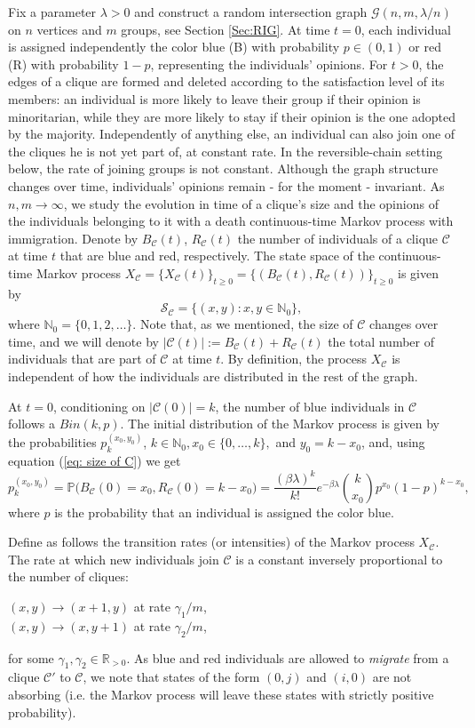 \documentclass{article}
\theoremstyle{remark}
\newtheorem*{partial proof}{Partial proof of the Conjecture}
\begin{document}
Fix a parameter $\lambda>0$ and construct a random intersection graph $\mathcal{G}(n,m,\lambda/n)$ on $n$ vertices and $m$ groups, see Section \ref{Sec:RIG}. At time $t=0$, each individual is assigned independently the color blue (B) with probability $p \in (0,1)$ or red (R) with probability $1-p$, representing the individuals' opinions. For $t>0$, the edges of a clique are formed and deleted according to the satisfaction level of its members: an individual is more likely to leave their group if their opinion is minoritarian, while they are more likely to stay if their opinion is the one adopted by the majority. Independently of anything else, an individual can also join one of the cliques he is not yet part of, at constant rate. In the reversible-chain setting below, the rate of joining groups is not constant. Although the graph structure changes over time, individuals' opinions remain - for the moment - invariant. As $n,m \to \infty$, we study the evolution in time of a clique's size and the opinions of the individuals belonging to it with a death continuous-time Markov process with immigration.
Denote by $B_\mathcal{C}(t)$, $R_\mathcal{C}(t)$ the number of individuals of a clique $\mathcal{C}$ at time $t$ that are blue and red, respectively. The state space of the continuous-time Markov process $X_\mathcal{C}=\{X_\mathcal{C}(t)\}_{t \geq 0}=\{(B_\mathcal{C}(t),R_\mathcal{C}(t))\}_{t \geq 0}$ is given by
$$
\mathcal{S}_\mathcal{C}=\{(x,y): x,y \in \mathbb{N}_0\},
$$
where $\mathbb{N}_0=\{0,1,2, \dots \}$. Note that, as we mentioned, the size of $\mathcal{C}$ changes over time, and we will denote by $\lvert \mathcal{C}(t) \lvert:= B_\mathcal{C}(t)+R_\mathcal{C}(t)$ the total number of individuals that are part of $\mathcal{C}$ at time $t$. By definition, the process $X_\mathcal{C}$ is independent of how the individuals are distributed in the rest of the graph.

At $t=0$, conditioning on $\lvert \mathcal{C}(0) \lvert=k$, the number of blue individuals in $\mathcal{C}$ follows a $Bin(k,p)$.
The initial distribution of the Markov process is given by the probabilities $p_k^{(x_0,y_0)}$, $k \in \mathbb{N}_{0}, x_0 \in \{0, \dots, k  \},$ and $y_0=k-x_0$, and, using equation (\ref{eq: size of C}) we get
$$
p_{k}^{(x_0,y_0)}=\mathbb{P} \big(  B_\mathcal{C}(0)=x_0, R_\mathcal{C}(0)=k-x_0)= \frac{(\beta \lambda)^k}{k!} e^{-\beta\lambda} \binom{k}{x_0}p^{x_0}(1-p)^{k-x_0},
$$
where $p$ is the probability that an individual is assigned the color blue.

Define as follows the transition rates (or intensities) of the Markov process $X_\mathcal{C}$. The rate at which new individuals join $\mathcal{C}$ is a constant inversely proportional to the number of cliques:
\begin{center}
    $(x,y) \to (x+1, y)$ at rate $\gamma_1/m$, \\
    $(x,y) \to (x, y+1)$ at rate $\gamma_2/m$,
\end{center}
for some $\gamma_1, \gamma_2 \in \mathbb{R}_{> 0}.$ As blue and red individuals are allowed to \textit{migrate} from a clique $\mathcal{C}'$ to $\mathcal{C}$, we note that states of the form $(0,j)$ and $(i,0)$ are not absorbing (i.e. the Markov process will leave these states with strictly positive probability).
\end{document}
